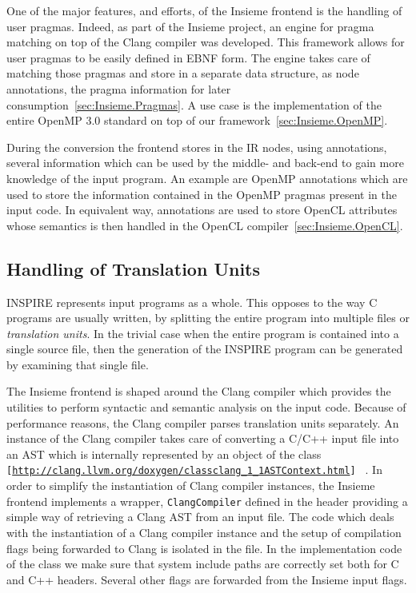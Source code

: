 One of the major features, and efforts, of the Insieme frontend is the handling
of user pragmas. Indeed, as part of the Insieme project, an engine for pragma
matching on top of the Clang compiler was developed. This framework allows for
user pragmas to be easily defined in EBNF form. The engine takes care of
matching those pragmas and store in a separate data structure, as node
annotations, the pragma information for later
consumption~\ref{sec:Insieme.Pragmas}. A use case is the implementation of the
entire OpenMP 3.0 standard on top of our framework~\ref{sec:Insieme.OpenMP}.

During the conversion the frontend stores in the IR nodes, using annotations,
several information which can be used by the middle- and back-end to gain more
knowledge of the input program. An example are OpenMP annotations which are used
to store the information contained in the OpenMP pragmas present in the input
code. In equivalent way, annotations are used to store OpenCL attributes whose
semantics is then handled in the OpenCL compiler~\ref{sec:Insieme.OpenCL}.

\subsection{Handling of Translation Units}
\label{sec:Insieme.Frontend.TranslationUnits}

INSPIRE represents input programs as a whole. This opposes to the way C programs
are usually written, by splitting the entire program into multiple files or
\emph{translation units}. In the trivial case when the entire program is
contained into a single source file, then the generation of the INSPIRE program
can be generated by examining that single file.

The Insieme frontend is shaped around the Clang compiler which provides the
utilities to perform syntactic and semantic analysis on the input code. Because
of performance reasons, the Clang compiler parses translation units separately.
An instance of the Clang compiler takes care of converting a C/C++ input file
into an AST which is internally represented by an object of the class
 {\tt [\url{http://clang.llvm.org/doxygen/classclang_1_1ASTContext.html}]
} . In order to simplify the instantiation of Clang compiler instances, the
Insieme frontend implements a wrapper, {\tt ClangCompiler} defined in the
 header providing a simple way of retrieving a Clang
AST from an input file. The code which deals with the instantiation of a Clang
compiler instance and the setup of compilation flags being forwarded to Clang is
isolated in the  file. In the implementation code of
the  class we make sure that system include paths are
correctly set both for C and C++ headers. Several other flags are forwarded from
the Insieme input flags. 



